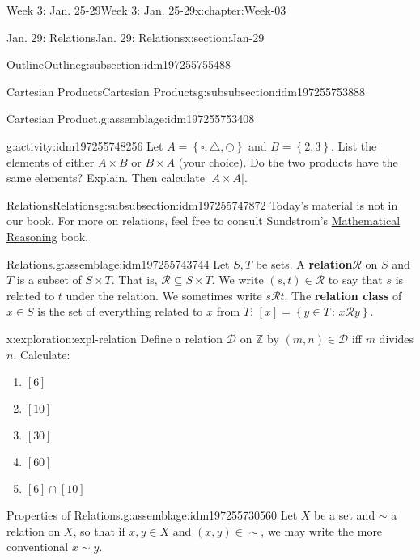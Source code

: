 \documentclass[oneside,10pt,]{book}
\newcommand{\terminology}[1]{\textbf{#1}}
\numberwithin{equation}{section}
\newcommand{\set}[1]{\left\{ {#1} \right\}}
\newcommand{\setof}[2]{{\left\{#1\,\colon\,#2\right\}}}
\def\Z{{\mathbb Z}}
\newcommand{\Z}{\mathbb Z}
\newcommand{\card}[1]{\left| #1 \right|}
\begin{document}
\begin{chapterptx}{Week 3: Jan. 25-29}{}{Week 3: Jan. 25-29}{}{}{x:chapter:Week-03}
\begin{sectionptx}{Jan. 29: Relations}{}{Jan. 29: Relations}{}{}{x:section:Jan-29}
\begin{subsectionptx}{Outline}{}{Outline}{}{}{g:subsection:idm197255755488}
\begin{subsubsectionptx}{Cartesian Products}{}{Cartesian Products}{}{}{g:subsubsection:idm197255753888}
\begin{assemblage}{Cartesian Product.}{g:assemblage:idm197255753408}
\end{assemblage}
\begin{activity}{}{g:activity:idm197255748256}%
Let \(A = \set{\square,\triangle,\bigcirc}\) and \(B=\set{2,3}\). List the elements of either \(A\times B\) or \(B\times A\) (your choice). Do the two products have the same elements? Explain. Then calculate \(\card{A\times A}\).%
\end{activity}%
\end{subsubsectionptx}
%
%
\typeout{************************************************}
\typeout{************************************************}
%
\begin{subsubsectionptx}{Relations}{}{Relations}{}{}{g:subsubsection:idm197255747872}
Today's material is not in our book. For more on relations, feel free to consult Sundstrom's \href{https://www.tedsundstrom.com/mathematical-reasoning-3}{Mathematical Reasoning} book.%
\begin{assemblage}{Relations.}{g:assemblage:idm197255743744}%
Let \(S,T\) be sets. A \terminology{relation}\(\mathcal{R}\) on \(S\) and \(T\) is a subset of \(S\times T\). That is, \(\mathcal{R}\subseteq S\times T\). We write \((s,t)\in \mathcal{R}\) to say that \(s\) is related to \(t\) under the relation. We sometimes write \(s \mathcal{R} t\). The \terminology{relation class} of \(x\in S\) is the set of everything related to \(x\) from \(T\): \([x] = \setof{y\in T}{x\mathcal{R}y}\).%
\end{assemblage}
\begin{exploration}{}{x:exploration:expl-relation}%
Define a relation \(\mathcal{D}\) on \(\Z\) by \((m,n)\in \mathcal{D}\) iff \(m\) divides \(n\). Calculate:%
%
\begin{enumerate}
\item{}\(\displaystyle [6]\)%
\item{}\(\displaystyle [10]\)%
\item{}\(\displaystyle [30]\)%
\item{}\(\displaystyle [60]\)%
\item{}\(\displaystyle [6]\cap[10]\)%
\end{enumerate}
\end{exploration}%
\begin{assemblage}{Properties of Relations.}{g:assemblage:idm197255730560}%
Let \(X\) be a set and \(\sim\) a relation on \(X\), so that if \(x,y\in X\) and \((x,y)\in \sim\), we may write the more conventional \(x\sim y\). %
\begin{enumerate}

\end{enumerate}
\end{assemblage}
\end{subsubsectionptx}
\end{subsectionptx}
\end{sectionptx}
\end{chapterptx}
\end{document}

